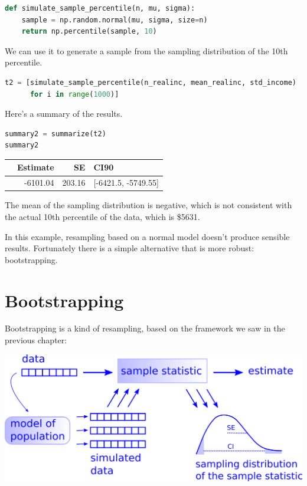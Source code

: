 \begin{lstlisting}[language=Python,style=source]
def simulate_sample_percentile(n, mu, sigma):
    sample = np.random.normal(mu, sigma, size=n)
    return np.percentile(sample, 10)
\end{lstlisting}

We can use it to generate a sample from the sampling distribution of the
10th percentile.

\begin{lstlisting}[language=Python,style=source]
t2 = [simulate_sample_percentile(n_realinc, mean_realinc, std_income)
      for i in range(1000)]
\end{lstlisting}

Here's a summary of the results.

\begin{lstlisting}[language=Python,style=source]
summary2 = summarize(t2)
summary2
\end{lstlisting}

\begin{tabular}{lrrl}
\toprule
{} &  Estimate &      SE &                 CI90 \\
\midrule
{} &  -6101.04 &  203.16 &  [-6421.5, -5749.55] \\
\bottomrule
\end{tabular}

The mean of the sampling distribution is negative, which is not
consistent with the actual 10th percentile of the data, which is \$5631.

In this example, resampling based on a normal model doesn't produce
sensible results. Fortunately there is a simple alternative that is more
robust: bootstrapping.

\hypertarget{bootstrapping}{%
\section{Bootstrapping}\label{bootstrapping}}

Bootstrapping is a kind of resampling, based on the framework we saw in
the previous chapter:

\includegraphics{figs/resampling.png}

